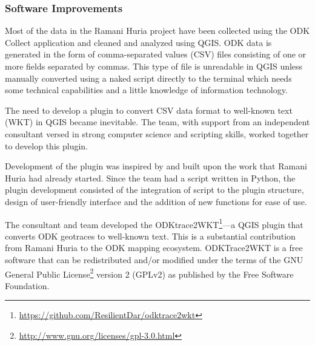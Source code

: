 \documentclass[a4paper,12pt,twoside]{article}
\begin{document}
\subsubsection{Software Improvements}
\begin{multicols}{2}
Most of the data in the Ramani Huria project have been collected using the ODK Collect application and cleaned and analyzed using QGIS. ODK data is generated in the form of comma-separated values (CSV) files consisting of one or more fields separated by commas. This type of file is unreadable in QGIS unless manually converted using a naked script directly to the terminal which needs some technical capabilities and a little knowledge of information technology.

The need to develop a plugin to convert CSV data format to well-known text (WKT) in QGIS became inevitable. The team, with support from an independent consultant versed in strong computer science and scripting skills, worked together to develop this plugin.

Development of the plugin was inspired by and built upon the work that Ramani Huria had already started. Since the team had a script written in Python, the plugin development consisted of the integration of script to the plugin structure, design of user-friendly interface and the addition of new functions for ease of use.

The consultant  and  team developed the ODKtrace2WKT\footnote{\url{https://github.com/ResilientDar/odktrace2wkt}}---a QGIS plugin that converts ODK geotraces to well-known text. This is a substantial contribution from Ramani Huria to the ODK mapping ecosystem. ODKTrace2WKT is a free software that can be redistributed and/or modified under the terms of the GNU General Public License\footnote{\url{http://www.gnu.org/licenses/gpl-3.0.html}} version 2 (GPLv2) as published by the Free Software Foundation.
\end{multicols}

\end{document}
